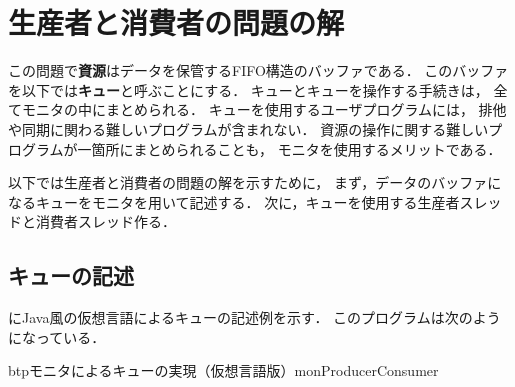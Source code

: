 \section{生産者と消費者の問題の解}
この問題で{\bf 資源}はデータを保管するFIFO構造のバッファである．
このバッファを以下では{\bf キュー}と呼ぶことにする．
キューとキューを操作する手続きは，
全てモニタの中にまとめられる．
キューを使用するユーザプログラムには，
排他や同期に関わる難しいプログラムが含まれない．
資源の操作に関する難しいプログラムが一箇所にまとめられることも，
モニタを使用するメリットである．

以下では生産者と消費者の問題の解を示すために，
まず，データのバッファになるキューをモニタを用いて記述する．
次に，キューを使用する生産者スレッドと消費者スレッド作る．

\subsection{キューの記述}
にJava風の仮想言語によるキューの記述例を示す．
このプログラムは次のようになっている．

\begin{myfig}{btp}{モニタによるキューの実現（仮想言語版）}{monProducerConsumer}

\end{myfig}

